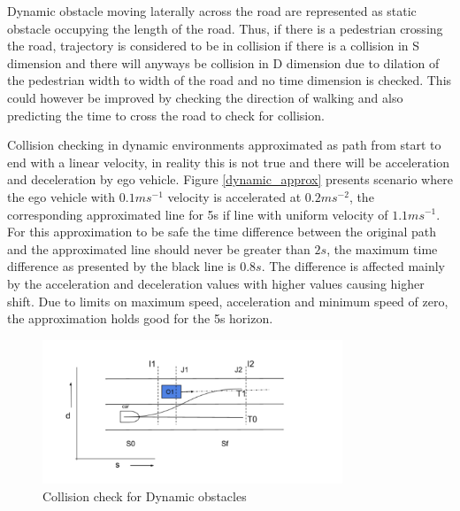 Dynamic obstacle moving laterally across the road are represented as static obstacle occupying the length of the road. Thus, if there is a pedestrian crossing the road, trajectory is considered to be in collision if there is a collision in S dimension and there will anyways be collision in D dimension due to dilation of the pedestrian width to width of the road and no time dimension is checked. This could however be improved by checking the direction of walking and also predicting the time to cross the road to check for collision. 

Collision checking in dynamic environments approximated as path from start to end with a linear velocity, in reality this is not true and there will be acceleration and deceleration by ego vehicle. Figure \ref{dynamic_approx} presents scenario where the ego vehicle with $0.1ms^{-1}$ velocity is accelerated at $0.2ms^{-2}$, the corresponding approximated line for 5s if line with uniform velocity of $1.1ms^{-1}$. For this approximation to be safe the time difference between the original path and the approximated line should never be greater than $2s$, the maximum time difference as presented by the black line is $0.8s$. The difference is affected mainly by the acceleration and deceleration values with higher values causing higher shift. Due to limits on maximum speed, acceleration and minimum speed of zero, the approximation holds good for the 5s horizon.



 \begin{figure}
    \centering
    \includegraphics[width=0.8\textwidth]{Images/dynamic_check.png}
    \caption{Collision check for Dynamic obstacles}
    \label{dynamic_check}
\end{figure}

